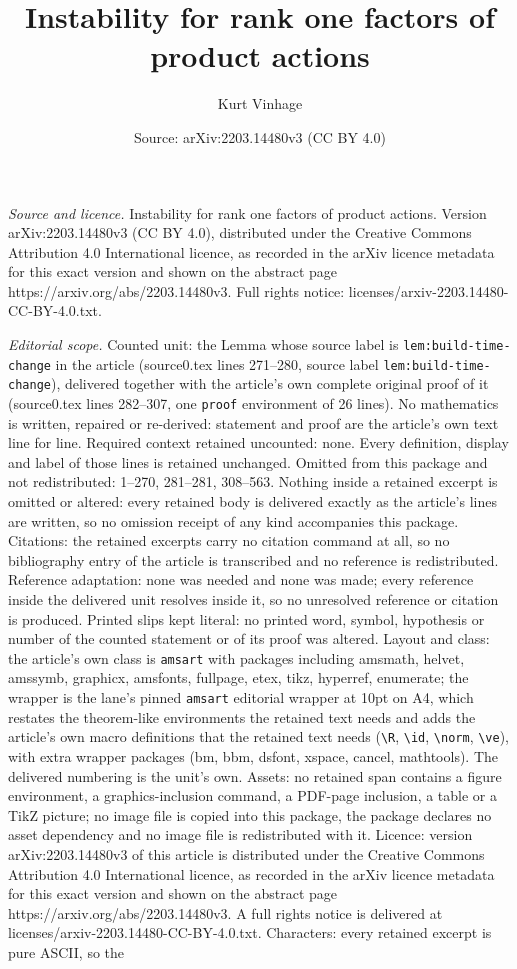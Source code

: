 \documentclass[10pt,a4paper]{amsart}
\title[Instability for rank one factors of product actions]{Instability for rank one factors of product actions}
\author{Kurt Vinhage}
\date{Source: arXiv:2203.14480v3 (CC BY 4.0)}
\begin{document}
\maketitle

\noindent\emph{Source and licence.} Instability for rank one factors of product actions. Version arXiv:2203.14480v3 (CC BY 4.0), distributed under the Creative Commons Attribution 4.0 International licence, as recorded in the arXiv licence metadata for this exact version and shown on the abstract page https://arxiv.org/abs/2203.14480v3. Full rights notice: licenses/arxiv-2203.14480-CC-BY-4.0.txt.\par\smallskip

\noindent\textit{Editorial scope.} Counted unit: the Lemma whose source label is \texttt{lem:build-time-change} in the article (source0.tex lines 271--280, source label \texttt{lem:build-time-change}), delivered together with the article's own complete original proof of it (source0.tex lines 282--307, one \texttt{proof} environment of 26 lines). No mathematics is written, repaired or re-derived: statement and proof are the article's own text line for line. Required context retained uncounted: none. Every definition, display and label of those lines is retained unchanged. Omitted from this package and not redistributed: 1--270, 281--281, 308--563. Nothing inside a retained excerpt is omitted or altered: every retained body is delivered exactly as the article's lines are written, so no omission receipt of any kind accompanies this package. Citations: the retained excerpts carry no citation command at all, so no bibliography entry of the article is transcribed and no reference is redistributed. Reference adaptation: none was needed and none was made; every reference inside the delivered unit resolves inside it, so no unresolved reference or citation is produced. Printed slips kept literal: no printed word, symbol, hypothesis or number of the counted statement or of its proof was altered. Layout and class: the article's own class is \texttt{amsart} with packages including amsmath, helvet, amssymb, graphicx, amsfonts, fullpage, etex, tikz, hyperref, enumerate; the wrapper is the lane's pinned \texttt{amsart} editorial wrapper at 10pt on A4, which restates the theorem-like environments the retained text needs and adds the article's own macro definitions that the retained text needs (\texttt{\textbackslash R}, \texttt{\textbackslash id}, \texttt{\textbackslash norm}, \texttt{\textbackslash ve}), with extra wrapper packages (bm, bbm, dsfont, xspace, cancel, mathtools). The delivered numbering is the unit's own. Assets: no retained span contains a figure environment, a graphics-inclusion command, a PDF-page inclusion, a table or a TikZ picture; no image file is copied into this package, the package declares no asset dependency and no image file is redistributed with it. Licence: version arXiv:2203.14480v3 of this article is distributed under the Creative Commons Attribution 4.0 International licence, as recorded in the arXiv licence metadata for this exact version and shown on the abstract page https://arxiv.org/abs/2203.14480v3. A full rights notice is delivered at licenses/arxiv-2203.14480-CC-BY-4.0.txt. Characters: every retained excerpt is pure ASCII, so the 
\end{document}
